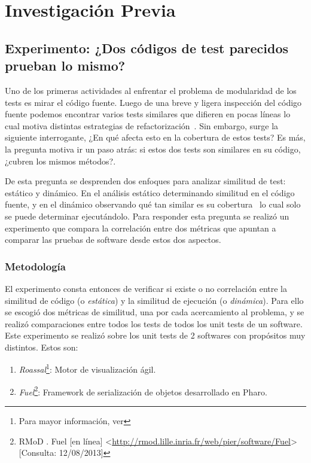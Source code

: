 \chapter{Investigación Previa}

\section{Experimento: ¿Dos códigos de test parecidos prueban lo mismo? }

\par Uno de los primeras actividades al enfrentar el problema de modularidad de los tests es mirar el código fuente. Luego de una breve y ligera inspección del código fuente podemos encontrar varios tests similares que difieren en pocas líneas lo cual motiva distintas estrategias de refactorización~\cite{roy2007survey,rattan2013software,Kosc13a}. Sin embargo, surge la siguiente interrogante, ¿En qué afecta esto en la cobertura de estos tests? Es más, la pregunta motiva ir un paso atrás: si estos dos tests son similares en su código, ¿cubren los mismos métodos?.

\par De esta pregunta se desprenden dos enfoques para analizar similitud de test: estático y dinámico. En el análisis estático determinando similitud en el código fuente, y en el dinámico observando qué tan similar es su cobertura~\cite{Horwi02a} lo cual solo se puede determinar ejecutándolo. Para responder esta pregunta se realizó un experimento que compara la correlación entre dos métricas que apuntan a comparar las pruebas de software desde estos dos aspectos.

\subsection{Metodología}

\par El experimento consta entonces de verificar si existe o no correlación entre la similitud de código (o \emph{estática}) y la similitud de ejecución (o \emph{dinámica}). Para ello se escogió dos métricas de similitud, una por cada acercamiento al problema, y se realizó comparaciones entre todos los tests de todos los unit tests de un software. Este experimento se realizó sobre los unit tests de 2 softwares con propósitos muy distintos. Estos son: 

\begin{enumerate} 
\item \emph{Roassal}\footnote{Para mayor información, ver }: Motor de visualización ágil.
\item \emph{Fuel}\footnote{RMoD . Fuel [en línea] \textless\url{http://rmod.lille.inria.fr/web/pier/software/Fuel}\textgreater [Consulta: 12/08/2013] }: Framework de serialización de objetos desarrollado en Pharo.
\end{enumerate}

